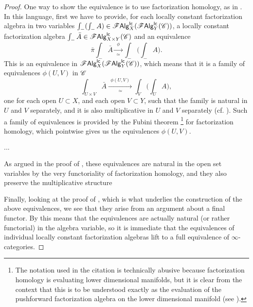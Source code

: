 \documentclass[../text.tex]{subfiles}
\begin{document}
\begin{proof}
    One way to show the equivalence is to use factorization homology, as in . In this language, first we have to provide, for each locally constant factorization algebra in two variables $\int_{-}(\int_{-} A) \in \mathscr{F} \mathsf{Alg}^{\mathsf{lc}}_{X}(\mathscr{F} \mathsf{Alg}^{\mathsf{lc}}_{Y}(\mathscr{C}))$, a locally constant factorization algebra $\int_{-} \bar{A} \in \mathscr{F} \mathsf{Alg}^{\mathsf{lc}}_{X \times Y} (\mathscr{C})$ and an equivalence
    \begin{equation}
        \bar{\pi} \int_{-} \bar{A} \xrightarrow[\simeq]{\ \ \phi \ \ } \int_{-} \big( \int_{-} A \big).
    \end{equation}
    This is an equivalence in $\mathscr{F} \mathsf{Alg}^{\mathsf{lc}}_{X}(\mathscr{F} \mathsf{Alg}^{\mathsf{lc}}_{Y}(\mathscr{C}))$, which means that it is a family of equivalences $\phi(U,V)$ in $\mathscr{C}$
    \begin{equation}
        \int_{U \times V} \bar{A} \xrightarrow[\simeq]{\ \ \phi (U,V)\ \ } \int_{V} \big( \int_{U} A \big),
    \end{equation}
    one for each open $U \subset X$, and each open $V \subset Y$, such that the family is natural in $U$ and $V$ separately, and it is also multiplicative in $U$ and $V$ separately (cf. ). Such a family of equivalences is provided by the Fubini theorem \cite[cor.2.29]{aft_fhstrat}\footnote{The notation used in the citation is technically abusive because factorization homology is evaluating lower dimensional manifolds, but it is clear from the context that this is to be understood exactly as the evaluation of the pushforward factorization algebra on the lower dimensional manifold (see ).} for factorization homology, which pointwise gives us the equivalences $\phi(U,V)$. 
    
    ...
    
    
    As argued in the proof of , these equivalences are natural in the open set variables by the very functoriality of factorization homology, and they also preserve the multiplicative structure %
    
    Finally, looking at the proof of \cite[thm.2.25]{aft_fhstrat}, which is what underlies the construction of the above equivalences, we see that they arise from an argument about a final functor. By  this means that the equivalences are actually natural (or rather functorial) in the algebra variable, so it is immediate that the equivalences of individual locally constant factorization algebras lift to a full equivalence of $\infty$-categories.
\end{proof}
\end{document}

